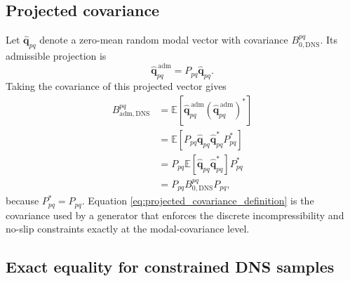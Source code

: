 \documentclass[11pt]{article}
\newcommand{\bfq}{\bm{q}}
\newcommand{\Bzero}{B_{0,\mathrm{DNS}}}
\newcommand{\Badm}{B_{\mathrm{adm},\mathrm{DNS}}}
\newcommand{\Pmat}{P}
\begin{document}
\subsection{Projected covariance}

Let \(\widehat{\bfq}_{pq}\) denote a zero-mean random modal vector with
covariance \(\Bzero^{pq}\). Its admissible projection is
\[
  \widehat{\bfq}_{pq}^{\,\mathrm{adm}}
  =
  \Pmat_{pq}\widehat{\bfq}_{pq}.
\]
Taking the covariance of this projected vector gives
\begin{align}
  \Badm^{pq}
  &=
  \mathbb{E}\left[
    \widehat{\bfq}_{pq}^{\,\mathrm{adm}}
    \left(\widehat{\bfq}_{pq}^{\,\mathrm{adm}}\right)^*
  \right] \nonumber\\
  &=
  \mathbb{E}\left[
    \Pmat_{pq}\widehat{\bfq}_{pq}
    \widehat{\bfq}_{pq}^*
    \Pmat_{pq}^*
  \right] \nonumber\\
  &=
  \Pmat_{pq}
  \mathbb{E}\left[
    \widehat{\bfq}_{pq}\widehat{\bfq}_{pq}^*
  \right]
  \Pmat_{pq}^* \nonumber\\
  &=
  \Pmat_{pq}\Bzero^{pq}\Pmat_{pq},
  \label{eq:projected_covariance_definition}
\end{align}
because \(\Pmat_{pq}^*=\Pmat_{pq}\). Equation
\eqref{eq:projected_covariance_definition} is the covariance used by a
generator that enforces the discrete incompressibility and no-slip constraints
exactly at the modal-covariance level.

\subsection{Exact equality for constrained DNS samples}
\label{subsec:exact_b0_badm_equality}
\end{document}

